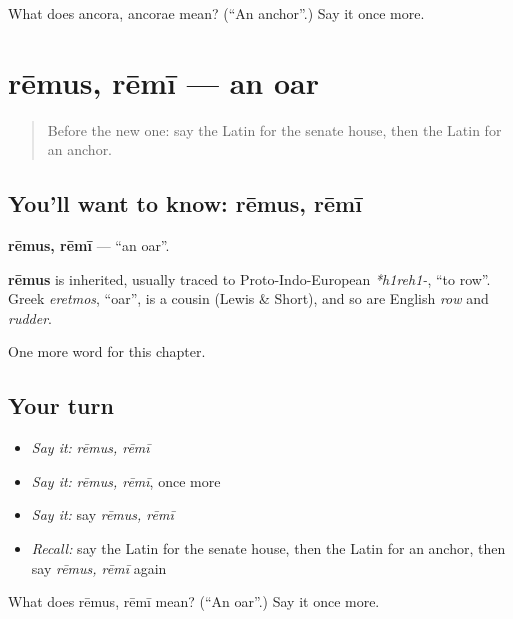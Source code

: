 \begin{tcolorbox}[breakable,colback=teal!4,colframe=teal!35!black,title={Before you move on}]
What does ancora, ancorae mean? (\textquotedblleft{}An anchor\textquotedblright{}.) Say it once more.
\end{tcolorbox}
\section[rēmus, rēmī]{rēmus, rēmī — an oar}

\label{lesson:LA-C270-remus}



\begin{quote}
Before the new one: say the Latin for the senate house, then the Latin for an anchor.
\end{quote}

\subsection*{You'll want to know: rēmus, rēmī}
\textbf{rēmus, rēmī} — \textquotedblleft{}an oar\textquotedblright{}.

\begin{cousinweb}
\textbf{rēmus} is inherited, usually traced to Proto-Indo-European \emph{*h1reh1-}, \textquotedblleft{}to row\textquotedblright{}. Greek \emph{eretmos}, \textquotedblleft{}oar\textquotedblright{}, is a cousin (Lewis \& Short), and so are English \emph{row} and \emph{rudder}.
\end{cousinweb}

\begin{grammarlens}[title={What you've built}]
One more word for this chapter.
\end{grammarlens}

\subsection*{Your turn}
\begin{itemize}
\raggedright
  \item \emph{Say it:} \emph{rēmus, rēmī}
  \item \emph{Say it:} \emph{rēmus, rēmī}, once more
  \item \emph{Say it:} say \emph{rēmus, rēmī}
  \item \emph{Recall:} say the Latin for the senate house, then the Latin for an anchor, then say \emph{rēmus, rēmī} again
\end{itemize}

\begin{tcolorbox}[breakable,colback=teal!4,colframe=teal!35!black,title={Before you move on}]
What does rēmus, rēmī mean? (\textquotedblleft{}An oar\textquotedblright{}.) Say it once more.
\end{tcolorbox}
